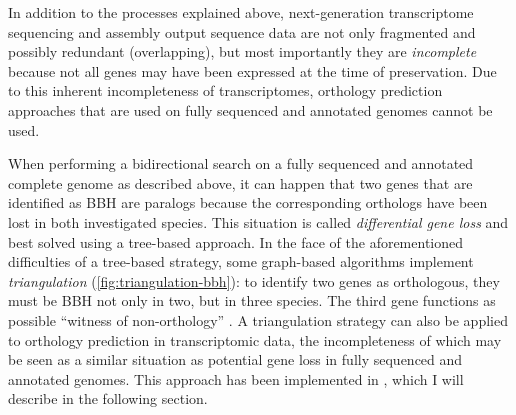 In addition to the processes explained above, next-generation transcriptome
sequencing and assembly output sequence data are not only fragmented and
possibly redundant (overlapping), but most importantly they are
\emph{incomplete} because not all genes may have been expressed at the time of
preservation. Due to this inherent incompleteness of transcriptomes, orthology
prediction approaches that are used on fully sequenced and annotated genomes
cannot be used.



When performing a bidirectional search on a fully sequenced and annotated
complete genome as described above, it can happen that two genes that are
identified as BBH are paralogs because the corresponding orthologs have been
lost in both investigated species. This situation is called \emph{differential
gene loss} and best solved using a tree-based approach. In the face of the
aforementioned difficulties of a tree-based strategy, some graph-based
algorithms implement \emph{triangulation} (\autoref{fig:triangulation-bbh}): to
identify two genes as orthologous, they must be BBH not only in two, but in
three species. The third gene functions as possible ``witness of non-orthology''
\citep{dessimoz2006}. A triangulation strategy can also be applied to orthology
prediction in transcriptomic data, the incompleteness of which may be seen as a
similar situation as potential gene loss in fully sequenced and annotated
genomes. This approach has been implemented in \hamstr \citep{ebersberger2009},
which I will describe in the following section.
